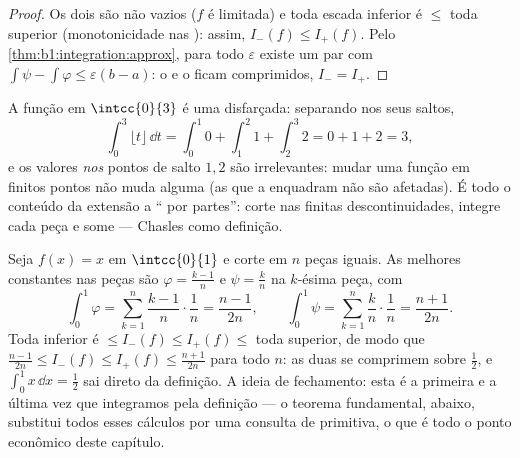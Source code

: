 \begin{proof}
Os dois  são não vazios ($f$ é limitada) e toda 
escada inferior é $\leq$ toda superior (monotonicidade nas ): assim, $I_-(f) \leq I_+(f)$. Pelo \cref{thm:b1:integration:approx}, para todo
$\varepsilon$ existe um par com $\int\psi - \int\varphi \leq
\varepsilon(b - a)$: o  e o  ficam comprimidos, $I_- =
I_+$.
\end{proof}

\begin{example}\label{ex:b1:integration:piecewise}
A função  em $\intcc{0}{3}$ é uma 
disfarçada: separando nos seus saltos,
\[
\int_0^3 \lfloor t \rfloor\,\dd t
= \int_0^1 0 + \int_1^2 1 + \int_2^3 2 = 0 + 1 + 2 = 3 ,
\]
e os valores \emph{nos} pontos de salto $1, 2$ são irrelevantes:
mudar uma função em finitos pontos não muda  alguma
(as  que a enquadram não são afetadas). É todo o
conteúdo da extensão a `` por partes'': corte nas
finitas descontinuidades, integre cada peça  e
some --- Chasles como definição.
\end{example}

\begin{example}\label{ex:b1:integration:defcompute}
Seja $f(x) = x$ em $\intcc{0}{1}$ e corte em $n$ peças iguais.
As melhores  constantes nas peças são $\varphi =
\frac{k-1}{n}$ e $\psi = \frac kn$ na $k$-ésima peça, com
\[
\int_0^1 \varphi = \sum_{k=1}^{n} \frac{k-1}{n}\cdot\frac1n
= \frac{n-1}{2n},
\qquad
\int_0^1 \psi = \sum_{k=1}^{n} \frac{k}{n}\cdot\frac1n
= \frac{n+1}{2n} .
\]
Toda  inferior é $\leq I_-(f) \leq I_+(f) \leq$ toda
superior, de modo que $\frac{n-1}{2n} \leq I_-(f) \leq I_+(f) \leq
\frac{n+1}{2n}$ para todo $n$: as duas se comprimem sobre $\frac12$, e
$\int_0^1 x\,\dd x = \frac12$ sai direto da definição. A
ideia de fechamento: esta é a primeira e a última vez que integramos
pela definição --- o teorema fundamental, abaixo, substitui
todos esses cálculos por uma consulta de primitiva, o que é
todo o ponto econômico deste capítulo.
\end{example}


